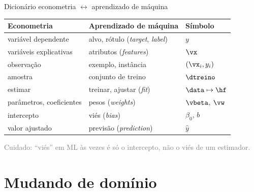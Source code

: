 \documentclass[aspectratio=169,11pt]{beamer}
\begin{document}
\begin{frame}{Dicionário econometria $\leftrightarrow$ aprendizado de máquina}
  \centering
  \begin{tabular}{@{}lll@{}}
    \toprule
    Econometria & Aprendizado de máquina & Símbolo \\
    \midrule
    variável dependente     & alvo, rótulo (\emph{target}, \emph{label})   & $y$ \\
    variáveis explicativas  & atributos (\emph{features})                    & $\vx$ \\
    observação              & exemplo, instância                             & $(\vx_i, y_i)$ \\
    amostra                 & conjunto de treino                             & $\dtreino$ \\
    estimar                 & treinar, ajustar (\emph{fit})                  & $\data \mapsto \hf$ \\
    parâmetros, coeficientes& pesos (\emph{weights})                         & $\vbeta$, $\vw$ \\
    intercepto              & viés (\emph{bias})                             & $\beta_0$, $b$ \\
    valor ajustado          & previsão (\emph{prediction})                   & $\hat y$ \\
    \bottomrule
  \end{tabular}
  \medskip

  \small\textcolor{gray}{Cuidado: ``viés'' em ML às vezes é só o intercepto, não o viés de um estimador.}
\end{frame}

\section{Mudando de domínio}
\end{document}

